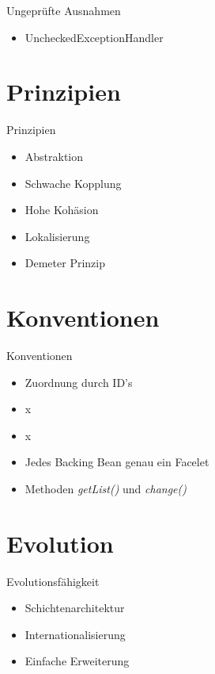 \documentclass{beamer}
\begin{document}
    \begin{frame}{Ungeprüfte Ausnahmen}
        \begin{itemize}
            \item UncheckedExceptionHandler
        \end{itemize}
    \end{frame}
    

    \section{Prinzipien}

    \begin{frame}{Prinzipien}
        \begin{itemize}
            \item Abstraktion \pause
            \item Schwache Kopplung \pause
            \item Hohe Kohäsion \pause
            \item Lokalisierung \pause
            \item Demeter Prinzip
        \end{itemize}
    \end{frame}


    \section{Konventionen}
    \begin{frame}{Konventionen}
        \pause
        \begin{itemize}
            \item Zuordnung durch ID's
            \item x 
            \item x \textrightarrow * \pause
            \item Jedes Backing Bean genau ein Facelet \pause
            \item Methoden \emph{getList()} und \emph{change()}
        \end{itemize}
    \end{frame}



    \section{Evolution}
    \begin{frame}{Evolutionsfähigkeit}
        \begin{itemize}
            \item Schichtenarchitektur
            \item Internationalisierung
            \item Einfache Erweiterung
        \end{itemize}
    \end{frame}
\end{document}
